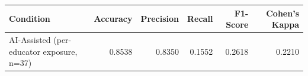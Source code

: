 \begin{tabular}{lrrrrr}
\toprule
Condition & Accuracy & Precision & Recall & F1-Score & Cohen's Kappa \\
\midrule
AI-Assisted (per-educator exposure, n=37) & 0.8538 & 0.8350 & 0.1552 & 0.2618 & 0.2210 \\
\bottomrule
\end{tabular}
